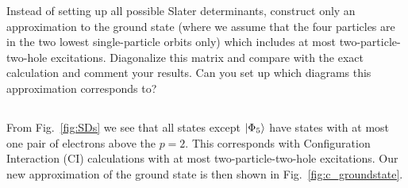 
Instead of setting up all possible Slater determinants, construct only an approximation to the ground state (where we assume that the four particles are in the two lowest single-particle orbits only) which includes at most two-particle-two-hole excitations.
Diagonalize this matrix and compare with the exact calculation and comment your results.
Can you set up which diagrams this approximation corresponds to?

\subsection{}
From Fig.~\ref{fig:SDs} we see that all states except $\lvert\Phi_5\rangle$ have states with at most one pair of electrons above the $p=2$.
This corresponds with Configuration Interaction (CI) calculations with at most two-particle-two-hole excitations.
Our new approximation of the ground state is then shown in Fig.~\ref{fig:c_groundstate}.

